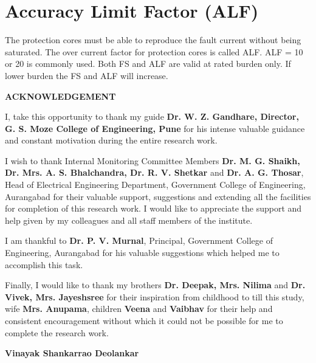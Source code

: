 \section*{Accuracy Limit Factor (ALF)}
The protection cores must be able to reproduce the fault current without being saturated. The over current factor for protection cores is called ALF. ALF = 10 or 20 is commonly used. Both FS and ALF are valid at rated burden only. If lower burden the FS and ALF will increase.
\setlength{\parskip}{0em}
\clearpage


\begin{center}
\large \textbf{ACKNOWLEDGEMENT}
\end{center}

\setlength{\parskip}{1em}
\justify \normalsize I, take this opportunity to thank my guide \textbf{Dr. W. Z. Gandhare, Director, G. S. Moze College of Engineering, Pune} for his intense valuable guidance and constant motivation during the entire research work.

I wish to thank Internal Monitoring Committee Members \textbf{Dr. M. G. Shaikh, Dr. Mrs. A. S. Bhalchandra, Dr. R. V. Shetkar} and \textbf{Dr. A. G. Thosar}, Head of Electrical Engineering Department, Government College of Engineering, Aurangabad for their valuable support, suggestions and extending all the facilities for completion of this research work. I would like to appreciate the support and help given by my colleagues and all staff members of the institute.

I am thankful to \textbf{Dr. P. V. Murnal}, Principal, Government College of Engineering, Aurangabad for his valuable suggestions which helped me to accomplish this task. 

Finally, I would like to thank my brothers \textbf{Dr. Deepak, Mrs. Nilima} and \textbf{Dr. Vivek, Mrs. Jayeshsree} for their inspiration from childhood to till this study, wife \textbf{Mrs. Anupama}, children \textbf{Veena} and \textbf{Vaibhav} for their help and consistent encouragement without which it could not be possible for me to complete the research work.


\setlength{\parskip}{0em}
\vspace{2cm}
\begin{flushright}
\textbf{Vinayak Shankarrao Deolankar}
\end{flushright}